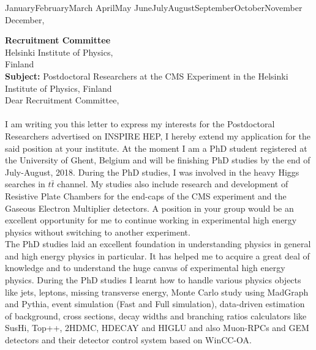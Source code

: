 \documentclass[]{article}
\begin{document}
\renewcommand{\today}{\ifcase \month \or January\or February\or March\or %
April\or May \or June\or July\or August\or September\or October\or November\or %
December\fi, \number \year} 

\pagestyle{empty}
\fontsize{12}{15}
\selectfont
\thispagestyle{empty}
\begin{flushright}
\today
\end{flushright} 
\noindent \textbf{Recruitment Committee}\\
\noindent Helsinki Institute of Physics,\\ 
\noindent Finland\\

\noindent \textbf{Subject:}
Postdoctoral Researchers at the CMS Experiment in the Helsinki Institute of Physics, Finland\\


\noindent Dear Recruitment Committee,
\\
\\
I am writing you this letter to express my interests for the Postdoctoral Researchers advertised on INSPIRE HEP, I hereby extend my application for the said position at your institute. At the moment I am a PhD student registered at the University of Ghent, Belgium and will be finishing PhD studies by the end of July-August, 2018. During the PhD studies, I was involved in the heavy Higgs searches in $t\bar t$ channel. My studies also include research and development of Resistive Plate Chambers for the end-caps of the CMS experiment and the Gaseous Electron Multiplier detectors. A position in your group would be an excellent opportunity for me to continue working in experimental high energy physics without switching to another experiment.\\

\noindent The PhD studies laid an excellent foundation in understanding physics in general and high energy physics in particular. It has helped me to acquire a great deal of knowledge and to understand the huge canvas of experimental high energy physics. During the PhD studies I learnt how to handle various physics objects like jets, leptons, missing transverse energy, Monte Carlo study using MadGraph and Pythia, event simulation (Fast and Full simulation), data-driven estimation of background, cross sections, decay widths and branching ratios calculators like SusHi, Top++, 2HDMC, HDECAY and HIGLU and also Muon-RPCs and GEM detectors and their detector control system based on WinCC-OA.\\
\end{document}
